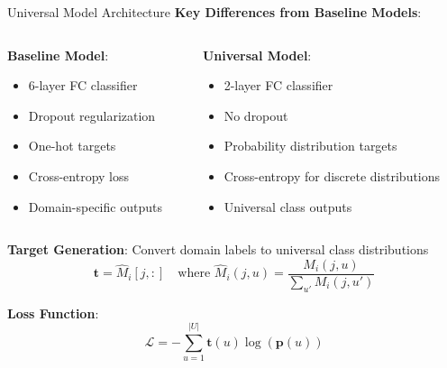 \documentclass[aspectratio=169]{beamer}
\begin{document}
\begin{frame}{Universal Model Architecture}
    \textbf{Key Differences from Baseline Models}:

    \begin{columns}[T]
        \begin{column}{0.48\textwidth}
            \textbf{Baseline Model}:
            \begin{itemize}
                \item 6-layer FC classifier
                \item Dropout regularization
                \item One-hot targets
                \item Cross-entropy loss
                \item Domain-specific outputs
            \end{itemize}
        \end{column}

        \begin{column}{0.48\textwidth}
            \textbf{Universal Model}:
            \begin{itemize}
                \item 2-layer FC classifier
                \item No dropout
                \item Probability distribution targets
                \item Cross-entropy for discrete distributions
                \item Universal class outputs
            \end{itemize}
        \end{column}
    \end{columns}

    \vspace{1em}

    \textbf{Target Generation}: Convert domain labels to universal class distributions
    \begin{equation}
        \mathbf{t} = \hat{M}_i[j, :] \quad \text{where } \hat{M}_i(j, u) = \frac{M_i(j, u)}{\sum_{u'} M_i(j, u')}
    \end{equation}

    \textbf{Loss Function}:
    \begin{equation}
        \mathcal{L} = -\sum_{u=1}^{|U|} \mathbf{t}(u) \log(\mathbf{p}(u))
    \end{equation}
\end{frame}
\end{document}
